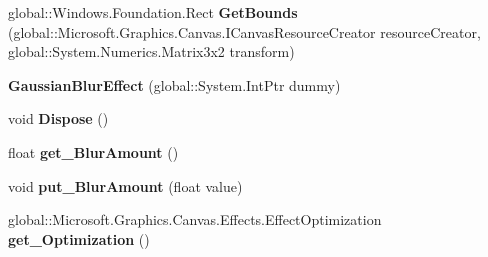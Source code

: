 \begin{DoxyCompactItemize}
\item 
\mbox{\label{class_microsoft_1_1_graphics_1_1_canvas_1_1_effects_1_1_gaussian_blur_effect_a650b47ec2f52a2c56cdc458ed3800b47}} 
global\+::\+Windows.\+Foundation.\+Rect {\bfseries Get\+Bounds} (global\+::\+Microsoft.\+Graphics.\+Canvas.\+I\+Canvas\+Resource\+Creator resource\+Creator, global\+::\+System.\+Numerics.\+Matrix3x2 transform)
\item 
\mbox{\label{class_microsoft_1_1_graphics_1_1_canvas_1_1_effects_1_1_gaussian_blur_effect_a001441f34b40b123ff0a4f6c0fa5adbb}} 
{\bfseries Gaussian\+Blur\+Effect} (global\+::\+System.\+Int\+Ptr dummy)
\item 
\mbox{\label{class_microsoft_1_1_graphics_1_1_canvas_1_1_effects_1_1_gaussian_blur_effect_a9cea4f6122394e148cdf4a3eb0624aa4}} 
void {\bfseries Dispose} ()
\item 
\mbox{\label{class_microsoft_1_1_graphics_1_1_canvas_1_1_effects_1_1_gaussian_blur_effect_a7b01eda1ee6f9bb08a3c9086d7ef1edb}} 
float {\bfseries get\+\_\+\+Blur\+Amount} ()
\item 
\mbox{\label{class_microsoft_1_1_graphics_1_1_canvas_1_1_effects_1_1_gaussian_blur_effect_a1dcdfb69af9895c2333497a0d1b4edde}} 
void {\bfseries put\+\_\+\+Blur\+Amount} (float value)
\item 
\mbox{\label{class_microsoft_1_1_graphics_1_1_canvas_1_1_effects_1_1_gaussian_blur_effect_aef6c39bc362d054ffa0e6349d24f02cd}} 
global\+::\+Microsoft.\+Graphics.\+Canvas.\+Effects.\+Effect\+Optimization {\bfseries get\+\_\+\+Optimization} ()
\item 
\mbox{\label{class_microsoft_1_1_graphics_1_1_canvas_1_1_effects_1_1_gaussian_blur_effect_af7fd358991e46db4322e11d372de3181}} 

\end{DoxyCompactItemize}
